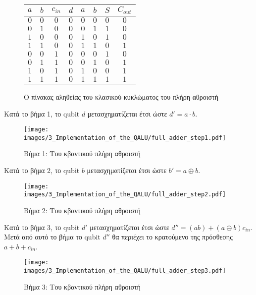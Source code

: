 \begin{figure}[ht]
  \centering
  \begin{tabular}{c c c c|c c c c}
    $a$ & $b$ & $c_{in}$ & $d$ & $a$ & $b$ & $S$ & $C_{out}$ \\
    \hline
    $0$ & $0$ & $0$ & $0$ & $0$ & $0$ & $0$ & $0$ \\
    $0$ & $1$ & $0$ & $0$ & $0$ & $1$ & $1$ & $0$ \\
    $1$ & $0$ & $0$ & $0$ & $1$ & $0$ & $1$ & $0$ \\
    $1$ & $1$ & $0$ & $0$ & $1$ & $1$ & $0$ & $1$ \\
    $0$ & $0$ & $1$ & $0$ & $0$ & $0$ & $1$ & $0$ \\
    $0$ & $1$ & $1$ & $0$ & $0$ & $1$ & $0$ & $1$ \\
    $1$ & $0$ & $1$ & $0$ & $1$ & $0$ & $0$ & $1$ \\
    $1$ & $1$ & $1$ & $0$ & $1$ & $1$ & $1$ & $1$ \\
  \end{tabular}
  \label{fig:13}
  \caption{Ο πίνακας αληθείας του κλασικού κυκλώματος του πλήρη αθροιστή}
\end{figure}


Κατά το βήμα 1, το qubit $d$ μετασχηματίζεται έτσι ώστε $d' = a \cdot b$.

\begin{figure}[!ht]
  \centering
  \texttt{[image: images/3\_Implementation\_of\_the\_QALU/full\_adder\_step1.pdf]}
  \label{fig:14}
  \caption{Βήμα 1: Του κβαντικού πλήρη αθροιστή}
\end{figure}

Κατά το βήμα 2, το qubit $b$ μετασχηματίζεται έτσι ώστε $b' = a \oplus b$.

\begin{figure}[!ht]
  \centering
  \texttt{[image: images/3\_Implementation\_of\_the\_QALU/full\_adder\_step2.pdf]}
  \label{fig:15}
  \caption{Βήμα 2: Του κβαντικού πλήρη αθροιστή}
\end{figure}

Κατά το βήμα 3, το qubit $d'$ μετασχηματίζεται έτσι ώστε $d'' = (ab) + (a \oplus b)c_{in}$.
Μετά από αυτό το βήμα το qubit $d''$ θα περιέχει το κρατούμενο της πρόσθεσης $a + b + c_{in}$.

\begin{figure}[!ht]
  \centering
  \texttt{[image: images/3\_Implementation\_of\_the\_QALU/full\_adder\_step3.pdf]}
  \label{fig:16}
  \caption{Βήμα 3: Του κβαντικού πλήρη αθροιστή}
\end{figure}

